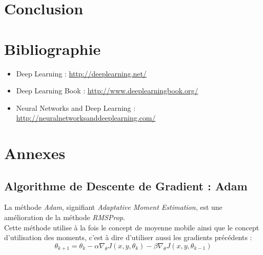 \documentclass[a4paper, 11pt]{report}
\begin{document}
\chapter{Conclusion}
\chapter*{Bibliographie}
\begin{itemize}
	\item Deep Learning : \url{http://deeplearning.net/}
	\item Deep Learning Book : \url{http://www.deeplearningbook.org/}
	\item Neural Networks and Deep Learning : \url{http://neuralnetworksanddeeplearning.com/}
\end{itemize}
\chapter*{Annexes}
\section{Algorithme de Descente de Gradient : Adam}
La méthode \emph{Adam}, signifiant \emph{Adaptative Moment Estimation}, est une amélioration de la méthode \emph{RMSProp}.\\
Cette méthode utilise à la fois le concept de moyenne mobile ainsi que le concept d'utilisation des moments, c'est à dire d'utiliser aussi les gradients précédents :
$$\theta_{k+1} = \theta_k - \alpha \nabla_\theta J(x,y,\theta_k) - \beta \nabla_\theta J(x,y,\theta_{k-1})$$
\end{document}
